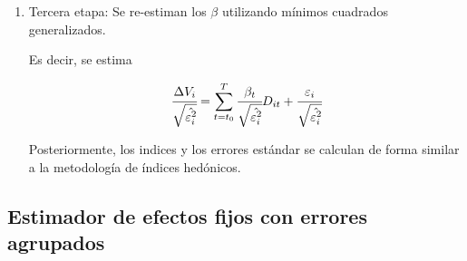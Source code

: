 \documentclass[conference]{IEEEtran}
\begin{document}
\begin{enumerate}
  \item Tercera etapa: Se re-estiman los $\beta$ utilizando mínimos cuadrados generalizados.
  
  Es decir, se estima 

  \[ \cfrac{\Delta V_i}{\sqrt{\hat{\varepsilon_i^2}}} = \sum_{t=t_0}^{T} \cfrac{\beta_t}{\sqrt{\hat{\varepsilon_i^2}}} D_{it} + \cfrac{\varepsilon_{i}}{\sqrt{\hat{\varepsilon_i^2}}} \]

  Posteriormente, los indices y los errores estándar se calculan de forma similar a la metodología de índices hedónicos.

\end{enumerate}


\subsection{Estimador de efectos fijos con errores agrupados}
\end{document}
